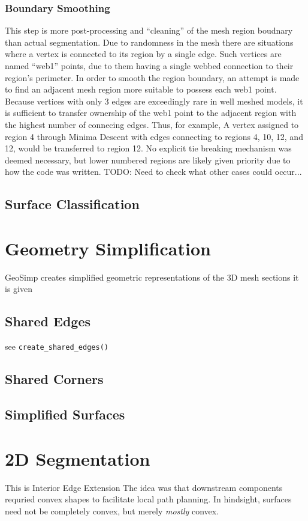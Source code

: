 \subsubsection{Boundary Smoothing}
This step is more post-processing and ``cleaning'' of the mesh region boudnary than actual segmentation.
Due to randomness in the mesh there are situations where a vertex is connected to its region by a single edge.
Such vertices are named ``web1'' points, due to them having a single webbed connection to their region's perimeter.
In order to smooth the region boundary, an attempt is made to find an adjacent mesh region more suitable to possess each web1 point.
Because vertices with only 3 edges are exceedingly rare in well meshed models, it is sufficient to transfer ownership of the web1 point to the adjacent region with the highest number of connecing edges.
Thus, for example, A vertex assigned to region 4 through Minima Descent with edges connecting to regions 4, 10, 12, and 12, would be transferred to region 12.
No explicit tie breaking mechanism was deemed necessary, but lower numbered regions are likely given priority due to how the code was written.
TODO: Need to check what other cases could occur...

\subsection{Surface Classification}

\section{Geometry Simplification}
GeoSimp creates simplified geometric representations of the 3D mesh sections it is given

\subsection{Shared Edges}
see \verb|create_shared_edges()|

\subsection{Shared Corners}

\subsection{Simplified Surfaces}

\section{2D Segmentation}
This is Interior Edge Extension
The idea was that downstream components requried convex shapes to facilitate local path planning.
In hindsight, surfaces need not be completely convex, but merely \textit{mostly} convex.

